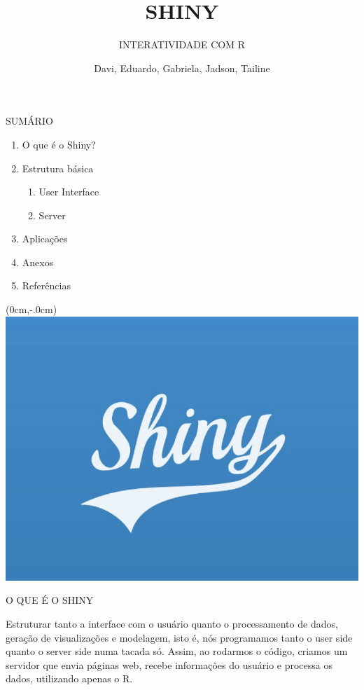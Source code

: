 \documentclass[
  ignorenonframetext,
]{beamer}
\title{SHINY}
\subtitle{INTERATIVIDADE COM R}
\author{Davi, Eduardo, Gabriela, Jadson, Tailine}
\date{}
\begin{document}
\frame{\titlepage}

\begin{frame}{SUMÁRIO}
\protect\hypertarget{sumario}{}

\begin{enumerate}
\item O que é o Shiny?
\item Estrutura básica
\begin{enumerate}
\item User Interface
\item Server
\end{enumerate}
\item Aplicações
\item Anexos
\item Referências
\end{enumerate}

\end{frame}

\begin{frame}{}
\protect\hypertarget{section}{}

\begin{textblock*}{0cm}(0cm,-.0cm)
\includegraphics[width=\paperwidth, height=\paperheight]{imagens/logo}
\end{textblock*}

\end{frame}

\begin{frame}{O QUE É O SHINY}
\protect\hypertarget{o-que-e-o-shiny}{}

Estruturar tanto a interface com o usuário quanto o processamento de
dados, geração de visualizações e modelagem, isto é, nós programamos
tanto o user side quanto o server side numa tacada só. Assim, ao
rodarmos o código, criamos um servidor que envia páginas web, recebe
informações do usuário e processa os dados, utilizando apenas o R.

\end{frame}
\end{document}
